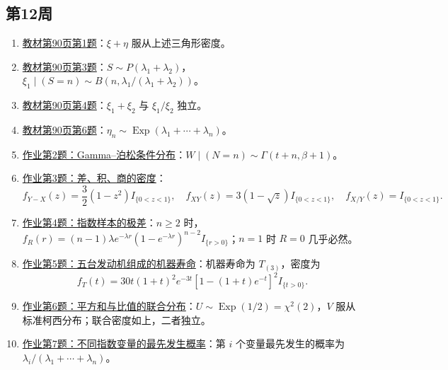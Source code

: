 \subsection*{第12周}
\begin{enumerate}
\item \hyperref[ex:w12-b90-1]{教材第90页第1题}：$\xi+\eta$ 服从上述三角形密度。
\item \hyperref[ex:w12-b90-3]{教材第90页第3题}：$S\sim P(\lambda_1+\lambda_2)$，$\xi_1\mid(S=n)\sim B(n,\lambda_1/(\lambda_1+\lambda_2))$。
\item \hyperref[ex:w12-b90-4]{教材第90页第4题}：$\xi_1+\xi_2$ 与 $\xi_1/\xi_2$ 独立。
\item \hyperref[ex:w12-b90-6]{教材第90页第6题}：$\eta_n\sim\operatorname{Exp}(\lambda_1+\cdots+\lambda_n)$。
\item \hyperref[ex:w12-h2]{作业第2题：Gamma--泊松条件分布}：$W\mid(N=n)\sim\Gamma(t+n,\beta+1)$。
\item \hyperref[ex:w12-h3]{作业第3题：差、积、商的密度}：\[
f_{Y-X}(z)=\frac32(1-z^2)I_{\{0<z<1\}},\quad
f_{XY}(z)=3(1-\sqrt z)I_{\{0<z<1\}},\quad
f_{X/Y}(z)=I_{\{0<z<1\}}.
\]
\item \hyperref[ex:w12-h4]{作业第4题：指数样本的极差}：$n\geq2$ 时，$f_R(r)=(n-1)\lambda e^{-\lambda r}(1-e^{-\lambda r})^{n-2}I_{\{r>0\}}$；$n=1$ 时 $R=0$ 几乎必然。
\item \hyperref[ex:w12-h5]{作业第5题：五台发动机组成的机器寿命}：机器寿命为 $T_{(3)}$，密度为
\[
f_T(t)=30t(1+t)^2e^{-3t}[1-(1+t)e^{-t}]^2I_{\{t>0\}}.
\]
\item \hyperref[ex:w12-h6]{作业第6题：平方和与比值的联合分布}：$U\sim\operatorname{Exp}(1/2)=\chi^2(2)$，$V$ 服从标准柯西分布；联合密度如上，二者独立。
\item \hyperref[ex:w12-h7]{作业第7题：不同指数变量的最先发生概率}：第 $i$ 个变量最先发生的概率为 $\lambda_i/(\lambda_1+\cdots+\lambda_n)$。
\end{enumerate}
